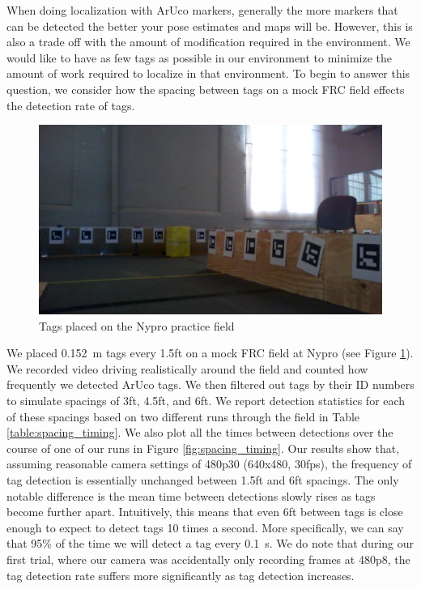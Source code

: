 \documentclass{article}
\begin{document}
    When doing localization with ArUco markers, generally the more markers that can be detected the better your pose estimates and maps will be. However, this is also a trade off with the amount of modification required in the environment. We would like to have as few tags as possible in our environment to minimize the amount of work required to localize in that environment. To begin to answer this question, we consider how the spacing between tags on a mock FRC field effects the detection rate of tags.

    \begin{figure}[H]
      \centering
      \includegraphics[width=1\linewidth]{./images/nypro_tag_spacing.png}
      \caption{Tags placed on the Nypro practice field}
      \label{fig:nypro_tag_spacing}
    \end{figure}

    We placed \SI{0.152}{\meter} tags every 1.5ft on a mock FRC field at Nypro (see Figure \ref{fig:nypro_tag_spacing}). We recorded video driving realistically around the field and counted how frequently we detected ArUco tags. We then filtered out tags by their ID numbers to simulate spacings of 3ft, 4.5ft, and 6ft. We report detection statistics for each of these spacings based on two different runs through the field in Table \ref{table:spacing_timing}. We also plot all the times between detections over the course of one of our runs in Figure \ref{fig:spacing_timing}. Our results show that, assuming reasonable camera settings of 480p30 (640x480, 30fps), the frequency of tag detection is essentially unchanged between 1.5ft and 6ft spacings. The only notable difference is the mean time between detections slowly rises as tags become further apart. Intuitively, this means that even 6ft between tags is close enough to expect to detect tags 10 times a second. More specifically, we can say that 95\% of the time we will detect a tag every \SI{0.1}{\second}. We do note that during our first trial, where our camera was accidentally only recording frames at 480p8, the tag detection rate suffers more significantly as tag detection increases.
\end{document}
